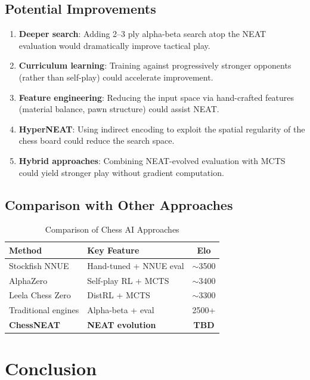 \documentclass[11pt, twocolumn]{article}
\begin{document}
\subsection{Potential Improvements}
\begin{enumerate}[leftmargin=*, itemsep=2pt]
    \item \textbf{Deeper search}: Adding 2--3 ply alpha-beta search atop the NEAT evaluation would dramatically improve tactical play.
    \item \textbf{Curriculum learning}: Training against progressively stronger opponents (rather than self-play) could accelerate improvement.
    \item \textbf{Feature engineering}: Reducing the input space via hand-crafted features (material balance, pawn structure) could assist NEAT.
    \item \textbf{HyperNEAT}: Using indirect encoding to exploit the spatial regularity of the chess board could reduce the search space.
    \item \textbf{Hybrid approaches}: Combining NEAT-evolved evaluation with MCTS could yield stronger play without gradient computation.
\end{enumerate}

\subsection{Comparison with Other Approaches}

\begin{table}[H]
\centering
\caption{Comparison of Chess AI Approaches}
\label{tab:comparison}
\small
\begin{tabularx}{\columnwidth}{@{}l X c@{}}
\toprule
\textbf{Method} & \textbf{Key Feature} & \textbf{Elo} \\
\midrule
Stockfish NNUE & Hand-tuned + NNUE eval & $\sim$3500 \\
AlphaZero & Self-play RL + MCTS & $\sim$3400 \\
Leela Chess Zero & DistRL + MCTS & $\sim$3300 \\
Traditional engines & Alpha-beta + eval & 2500+ \\
\textbf{ChessNEAT} & \textbf{NEAT evolution} & \textbf{TBD} \\
\bottomrule
\end{tabularx}
\end{table}

\section{Conclusion}
\label{sec:conclusion}
\end{document}
